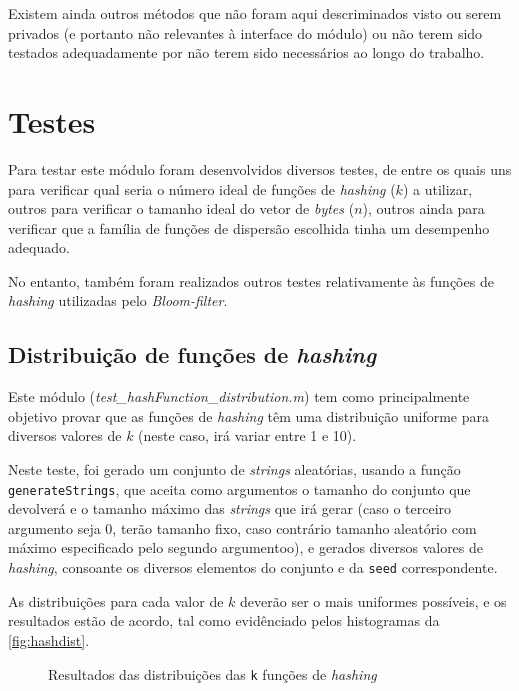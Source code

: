 \documentclass[a4paper,11pt,openright,oneside]{report}
\begin{document}
Existem ainda outros métodos que não foram aqui descriminados visto ou serem privados (e portanto não relevantes à interface do módulo) ou não terem sido testados adequadamente por não terem sido necessários ao longo do trabalho.

\section{Testes}
\label{sec.bloomtests}

Para testar este módulo foram desenvolvidos diversos testes, de entre os quais uns para verificar qual seria o número ideal de funções de \textit{hashing} ($k$) a utilizar, outros para verificar o tamanho ideal do vetor de \textit{bytes} ($n$), outros ainda para verificar que a família de funções de dispersão escolhida tinha um desempenho adequado.

No entanto, também foram realizados outros testes relativamente às funções de \textit{hashing} utilizadas pelo \textit{Bloom-filter}.

\subsection{Distribuição de funções de \textit{hashing}}
\label{subsec.hashdist}

Este módulo (\textit{test\_hashFunction\_distribution.m}) tem como principalmente objetivo provar que as funções de \textit{hashing} têm uma distribuição uniforme para diversos valores de $k$ (neste caso, irá variar entre 1 e 10).

Neste teste, foi gerado um conjunto de \textit{strings} aleatórias, usando a função \texttt{generateStrings}, que aceita como argumentos o tamanho do conjunto que devolverá e o tamanho máximo das \textit{strings} que irá gerar (caso o terceiro argumento seja $0$, terão tamanho fixo, caso contrário tamanho aleatório com máximo especificado pelo segundo argumentoo), e gerados diversos valores de \textit{hashing}, consoante os diversos elementos do conjunto e da \texttt{seed} correspondente.

As distribuições para cada valor de $k$ deverão ser o mais uniformes possíveis, e os resultados estão de acordo, tal como evidênciado pelos histogramas da \autoref{fig:hashdist}.

\begin{figure}[ht]	
\center
{}
\caption{Resultados das distribuições das \texttt{k} funções de \textit{hashing}}
\label{fig:hashdist}
\end{figure}
\end{document}
